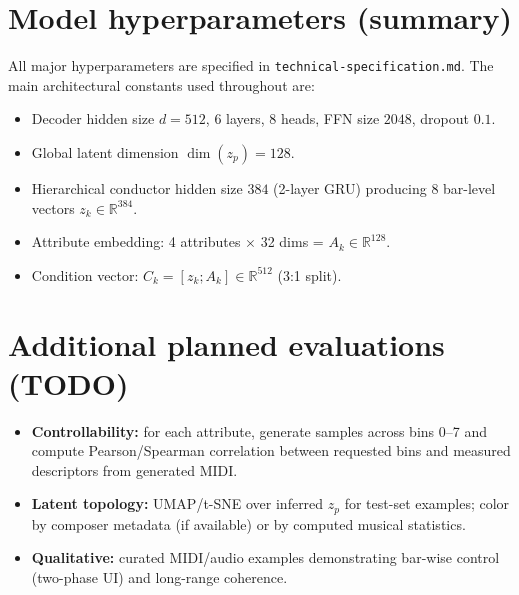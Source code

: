 \documentclass[10pt]{article}
\begin{document}
\section{Model hyperparameters (summary)}
All major hyperparameters are specified in \texttt{technical-specification.md}. The main architectural constants used throughout are:
\begin{itemize}[leftmargin=*,itemsep=0pt]
  \item Decoder hidden size $d=512$, $6$ layers, $8$ heads, FFN size $2048$, dropout $0.1$.
  \item Global latent dimension $\dim(z_p)=128$.
  \item Hierarchical conductor hidden size $384$ (2-layer GRU) producing 8 bar-level vectors $z_k\in\mathbb{R}^{384}$.
  \item Attribute embedding: 4 attributes $\times$ 32 dims = $A_k\in\mathbb{R}^{128}$.
  \item Condition vector: $C_k=[z_k;A_k]\in\mathbb{R}^{512}$ (3:1 split).
\end{itemize}

\section{Additional planned evaluations (TODO)}
\begin{itemize}[leftmargin=*,itemsep=0pt]
  \item \textbf{Controllability:} for each attribute, generate samples across bins 0--7 and compute Pearson/Spearman correlation between requested bins and measured descriptors from generated MIDI.
  \item \textbf{Latent topology:} UMAP/t-SNE over inferred $z_p$ for test-set examples; color by composer metadata (if available) or by computed musical statistics.
  \item \textbf{Qualitative:} curated MIDI/audio examples demonstrating bar-wise control (two-phase UI) and long-range coherence.
\end{itemize}


\end{document}
